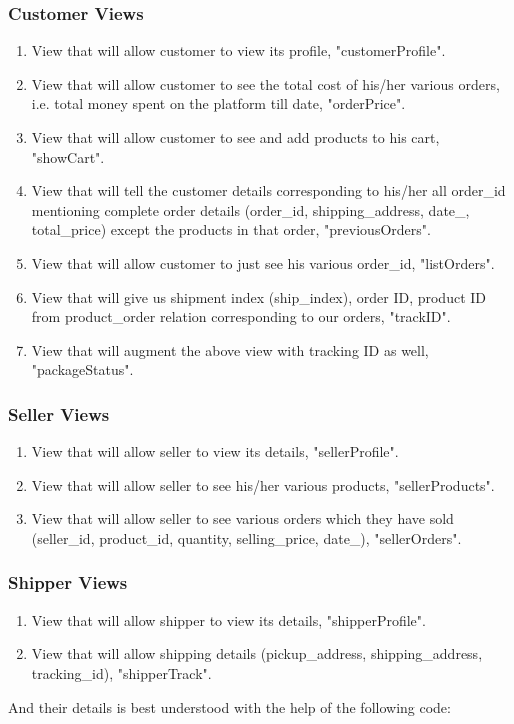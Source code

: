 \documentclass[a4paper,12pt]{article}
\begin{document}
\subsubsection{Customer Views}
\begin{enumerate}
  \item View that will allow customer to view its profile, "customerProfile".
  \item View that will allow customer to see the total cost of his/her various orders, i.e. total money spent on the platform till date, "orderPrice". 
  \item View that will allow customer to see and add products to his cart, "showCart".
  \item View that will tell the customer details corresponding to his/her all order\_id mentioning complete order details (order\_id, shipping\_address, date\_, total\_price) except the products in that order, "previousOrders". 
  \item View that will allow customer to just see his various order\_id, "listOrders". 
  \item View that will give us shipment index (ship\_index), order ID, product ID from product\_order relation corresponding to our orders, "trackID".
  \item View that will augment the above view with tracking ID as well, "packageStatus".
\end{enumerate}
\subsubsection{Seller Views}
\begin{enumerate}
  \item View that will allow seller to view its details, "sellerProfile".
  \item View that will allow seller to see his/her various products, "sellerProducts".
  \item View that will allow seller to see various orders which they have sold (seller\_id, product\_id, quantity, selling\_price, date\_), "sellerOrders".
\end{enumerate}
\subsubsection{Shipper Views}
\begin{enumerate}
  \item View that will allow shipper to view its details, "shipperProfile".
  \item View that will allow shipping details (pickup\_address, shipping\_address, tracking\_id), "shipperTrack".
\end{enumerate}
And their details is best understood with the help of the following code:
\end{document}
